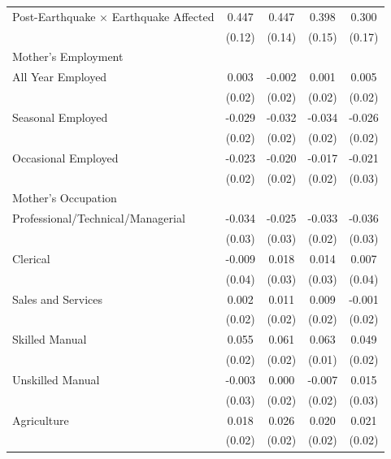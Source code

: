 \begin{longtable}{l*{4}{c}}
Post-Earthquake × Earthquake Affected & 0.447\sym{***} & 0.447\sym{***} & 0.398\sym{***} & 0.300\sym{*} \\
                    & (0.12) & (0.14) & (0.15) & (0.17) \\
\multicolumn{5}{l}{Mother's Employment} \\
\hspace{1em}All Year Employed & 0.003 & -0.002 & 0.001 & 0.005 \\
                    & (0.02) & (0.02) & (0.02) & (0.02) \\
\hspace{1em}Seasonal Employed & -0.029 & -0.032\sym{*} & -0.034\sym{**} & -0.026 \\
                    & (0.02) & (0.02) & (0.02) & (0.02) \\
\hspace{1em}Occasional Employed & -0.023 & -0.020 & -0.017 & -0.021 \\
                    & (0.02) & (0.02) & (0.02) & (0.03) \\
\multicolumn{5}{l}{Mother's Occupation} \\
\hspace{1em}Professional/Technical/Managerial & -0.034 & -0.025 & -0.033 & -0.036 \\
                    & (0.03) & (0.03) & (0.02) & (0.03) \\
\hspace{1em}Clerical & -0.009 & 0.018 & 0.014 & 0.007 \\
                    & (0.04) & (0.03) & (0.03) & (0.04) \\
\hspace{1em}Sales and Services & 0.002 & 0.011 & 0.009 & -0.001 \\
                    & (0.02) & (0.02) & (0.02) & (0.02) \\
\hspace{1em}Skilled Manual & 0.055\sym{***} & 0.061\sym{***} & 0.063\sym{***} & 0.049\sym{**} \\
                    & (0.02) & (0.02) & (0.01) & (0.02) \\
\hspace{1em}Unskilled Manual & -0.003 & 0.000 & -0.007 & 0.015 \\
                    & (0.03) & (0.02) & (0.02) & (0.03) \\
\hspace{1em}Agriculture & 0.018 & 0.026 & 0.020 & 0.021 \\
                    & (0.02) & (0.02) & (0.02) & (0.02) \\

\end{longtable}

